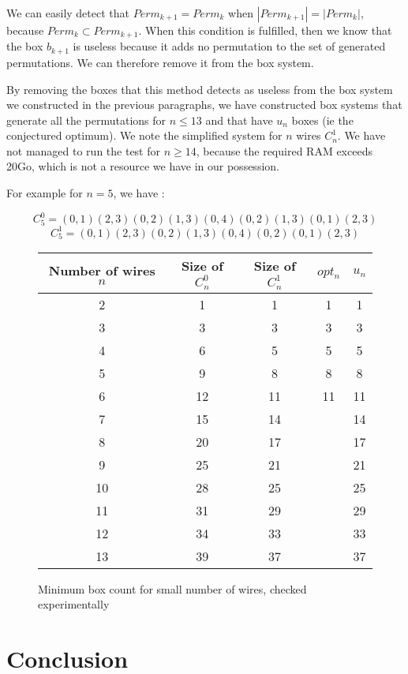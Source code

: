 \documentclass[11pt, a4paper]{article}
\begin{document}
We can easily detect that $Perm_{k+1} = Perm_k$ when $ |Perm_{k+1}| = |Perm_k|$,
because $Perm_k \subset Perm_{k+1}$. When this condition is fulfilled, then we
know that the box $b_{k+1}$ is useless because it adds no permutation to the set
of generated permutations. We can therefore remove it from the box system.

By removing the boxes that this method detects as useless from the box system we
constructed in the previous paragraphs, we have constructed box systems that
generate all the permutations for $n \leq 13$ and that have $u_n$ boxes (ie the
conjectured optimum). We note the simplified system for $n$ wires $C_n^1$. We
have not managed to run the test for $n \geq 14$, because the required RAM
exceeds 20Go, which is not a resource we have in our possession.

For example for $n=5$, we have :

$$C_5^0 = (0,1)(2,3)(0,2)(1,3)(0,4)(0,2)(1,3)(0,1)(2,3)$$
$$C_5^1 = (0,1)(2,3)(0,2)(1,3)(0,4)(0,2)(0,1)(2,3)$$

\begin{figure}
    \centering
    \begin{tabular}{|c|c|c|c|c|}
    \hline
    Number of wires $n$ & Size of $C_n^0$ & Size of $C_n^1$ & $opt_n$ &
	$u_n$ \\
    \hline
    2 & 1 & 1 & 1 & 1 \\
    3 & 3 & 3 & 3 & 3 \\
    4 & 6 & 5 & 5 & 5\\
    5 & 9 & 8 & 8 & 8\\
    6 & 12 & 11 & 11 & 11 \\
    7 & 15 & 14 &   & 14\\
    8 & 20 & 17 &   & 17\\
    9 & 25 & 21 &   & 21\\
    10 & 28 & 25 &   & 25\\
    11 & 31 & 29 &   & 29\\
    12 & 34 & 33 &   & 33\\
    13 & 39 & 37 &   & 37\\
    \hline
    \end{tabular}
    \caption{Minimum box count for small number of wires, checked experimentally}
    \label{box-count}
\end{figure}

\section{Conclusion}
\end{document}
